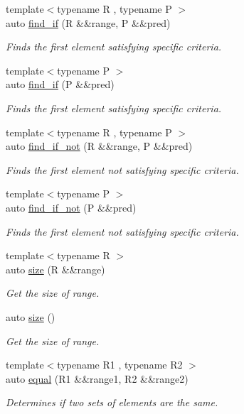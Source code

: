 \begin{DoxyCompactItemize}
{\footnotesize template$<$typename R , typename P $>$ }\\auto \mbox{\hyperlink{namespacerah_acbd71a185a2510e691dcd715a31edf53}{find\+\_\+if}} (R \&\&range, P \&\&pred)
\begin{DoxyCompactList}\small\item\em Finds the first element satisfying specific criteria. \end{DoxyCompactList}\item 
{\footnotesize template$<$typename P $>$ }\\auto \mbox{\hyperlink{namespacerah_a04200b08ecdef8daf99f04c58f29e459}{find\+\_\+if}} (P \&\&pred)
\begin{DoxyCompactList}\small\item\em Finds the first element satisfying specific criteria. \end{DoxyCompactList}\item 
{\footnotesize template$<$typename R , typename P $>$ }\\auto \mbox{\hyperlink{namespacerah_af758ef3c67d20ba6260319cb0e0171c5}{find\+\_\+if\+\_\+not}} (R \&\&range, P \&\&pred)
\begin{DoxyCompactList}\small\item\em Finds the first element not satisfying specific criteria. \end{DoxyCompactList}\item 
{\footnotesize template$<$typename P $>$ }\\auto \mbox{\hyperlink{namespacerah_a406c37a2cf758e7329bfd696a6bf8f89}{find\+\_\+if\+\_\+not}} (P \&\&pred)
\begin{DoxyCompactList}\small\item\em Finds the first element not satisfying specific criteria. \end{DoxyCompactList}\item 
{\footnotesize template$<$typename R $>$ }\\auto \mbox{\hyperlink{namespacerah_a85af749badb4261aa3c97a1d98134493}{size}} (R \&\&range)
\begin{DoxyCompactList}\small\item\em Get the size of range. \end{DoxyCompactList}\item 
auto \mbox{\hyperlink{namespacerah_aaee48fa7a804b4fd19c6a78bdd8d4c85}{size}} ()
\begin{DoxyCompactList}\small\item\em Get the size of range. \end{DoxyCompactList}\item 
{\footnotesize template$<$typename R1 , typename R2 $>$ }\\auto \mbox{\hyperlink{namespacerah_abf321dffb33d6a2d752aa091fdba7bbf}{equal}} (R1 \&\&range1, R2 \&\&range2)
\begin{DoxyCompactList}\small\item\em Determines if two sets of elements are the same. \end{DoxyCompactList}\end{DoxyCompactItemize}


